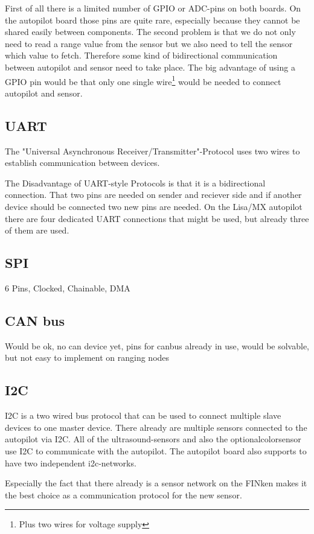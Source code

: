 First of all there is a limited number of GPIO or ADC-pins on both boards.
On the autopilot board those pins are quite rare, especially because they cannot be shared easily between components.
The second problem is that we do not only need to read a range value from the sensor but we also need to tell the sensor which value to fetch.
Therefore some kind of bidirectional communication between autopilot and sensor need to take place.
The big advantage of using a GPIO pin would be that only one single wire\footnote{Plus two wires for voltage supply} would be needed to connect autopilot and sensor.

\subsection{UART}
The "Universal Asynchronous Receiver/Transmitter"-Protocol uses two wires to establish communication between devices.
\cite{wingen_automatic_2004}

The Disadvantage of UART-style Protocols is that it is a bidirectional connection.
That two pins are needed on sender and reciever side and if another device should be connected two new pins are needed.
On the Lisa/MX autopilot there are four dedicated UART connections that might be used, but already three of them are used.

\subsection{SPI}
6 Pins, Clocked, Chainable, DMA

\subsection{CAN bus}
Would be ok, no can device yet, pins for canbus already in use, would be solvable, but not easy to implement on ranging nodes

\subsection{I2C}
I2C is a two wired bus protocol that can be used to connect multiple slave devices to one master device.
There already are multiple sensors connected to the autopilot via I2C.
All of the ultrasound-sensors and also the optionalcolorsensor use I2C to communicate with the autopilot.
The autopilot board also supports to have two independent i2c-networks.

Especially the fact that there already is a sensor network on the FINken makes it the best choice as a communication protocol for the new sensor.



